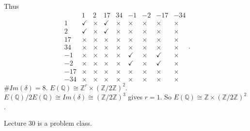\documentclass{article}
\newcommand{\Z}{\mathbb{Z}}
\newcommand{\Q}{\mathbb{Q}}
\newcommand{\rb}[1]{\left( #1 \right)}
\theoremstyle{definition}\newtheorem{definition}{Definition}[section]
\theoremstyle{definition}\newtheorem{remark}[definition]{Remark}
\theoremstyle{definition}\newtheorem*{example}{Example}
\theoremstyle{definition}\newtheorem*{note}{Note}
\begin{document}
Thus
$$
\begin{array}{c|cccc|cccc}
& 1 & 2 & 17 & 34 & -1 & -2 & -17 & -34 \\
\hline
1 & \checkmark & \times & \checkmark & \times & \times & \times & \times & \times \\
2 & \checkmark & \times & \checkmark & \times & \times & \times & \times & \times \\
17 & \times & \times & \times & \times & \times & \times & \times & \times \\
34 & \times & \times & \times & \times & \times & \times & \times & \times \\
\hline
-1 & \times & \times & \times & \times & \checkmark & \times & \checkmark & \times \\
-2 & \times & \times & \times & \times & \checkmark & \times & \checkmark & \times \\
-17 & \times & \times & \times & \times & \times & \times & \times & \times \\
-34 & \times & \times & \times & \times & \times & \times & \times & \times
\end{array}.
$$
$ \#Im\rb{\delta} = 8 $. $ E\rb{\Q} \cong \Z^r \times \rb{\Z / 2\Z}^2 $. $ E\rb{\Q} / 2E\rb{\Q} \cong Im\rb{\delta} \cong \rb{\Z / 2\Z}^3 $ gives $ r = 1 $. So $ E\rb{\Q} \cong \Z \times \rb{\Z / 2\Z}^2 $.


Lecture 30 is a problem class.
\end{document}
